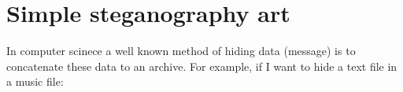 \section{Simple steganography art}
In computer scinece a well known method of hiding data (message) is to
concatenate these data to an archive. For example, if I want to hide a
text file in a music file:

